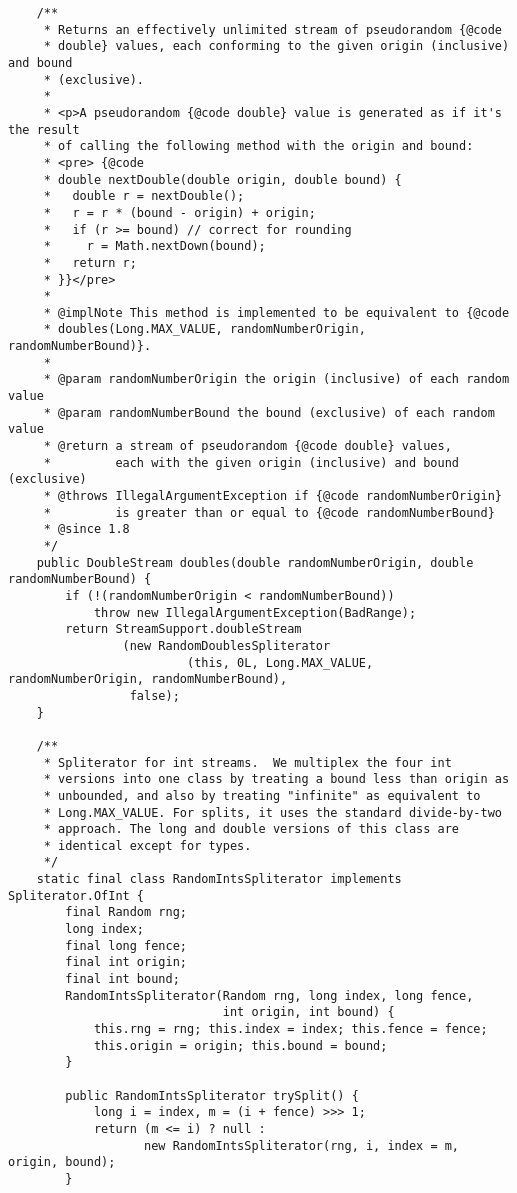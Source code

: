 \documentclass[12pt,a4paper,twoside,openright,titlepage,final]{article}
\begin{document}
\begin{verbatim}
    /**
     * Returns an effectively unlimited stream of pseudorandom {@code
     * double} values, each conforming to the given origin (inclusive) and bound
     * (exclusive).
     *
     * <p>A pseudorandom {@code double} value is generated as if it's the result
     * of calling the following method with the origin and bound:
     * <pre> {@code
     * double nextDouble(double origin, double bound) {
     *   double r = nextDouble();
     *   r = r * (bound - origin) + origin;
     *   if (r >= bound) // correct for rounding
     *     r = Math.nextDown(bound);
     *   return r;
     * }}</pre>
     *
     * @implNote This method is implemented to be equivalent to {@code
     * doubles(Long.MAX_VALUE, randomNumberOrigin, randomNumberBound)}.
     *
     * @param randomNumberOrigin the origin (inclusive) of each random value
     * @param randomNumberBound the bound (exclusive) of each random value
     * @return a stream of pseudorandom {@code double} values,
     *         each with the given origin (inclusive) and bound (exclusive)
     * @throws IllegalArgumentException if {@code randomNumberOrigin}
     *         is greater than or equal to {@code randomNumberBound}
     * @since 1.8
     */
    public DoubleStream doubles(double randomNumberOrigin, double randomNumberBound) {
        if (!(randomNumberOrigin < randomNumberBound))
            throw new IllegalArgumentException(BadRange);
        return StreamSupport.doubleStream
                (new RandomDoublesSpliterator
                         (this, 0L, Long.MAX_VALUE, randomNumberOrigin, randomNumberBound),
                 false);
    }

    /**
     * Spliterator for int streams.  We multiplex the four int
     * versions into one class by treating a bound less than origin as
     * unbounded, and also by treating "infinite" as equivalent to
     * Long.MAX_VALUE. For splits, it uses the standard divide-by-two
     * approach. The long and double versions of this class are
     * identical except for types.
     */
    static final class RandomIntsSpliterator implements Spliterator.OfInt {
        final Random rng;
        long index;
        final long fence;
        final int origin;
        final int bound;
        RandomIntsSpliterator(Random rng, long index, long fence,
                              int origin, int bound) {
            this.rng = rng; this.index = index; this.fence = fence;
            this.origin = origin; this.bound = bound;
        }

        public RandomIntsSpliterator trySplit() {
            long i = index, m = (i + fence) >>> 1;
            return (m <= i) ? null :
                   new RandomIntsSpliterator(rng, i, index = m, origin, bound);
        }


\end{verbatim}
\end{document}
